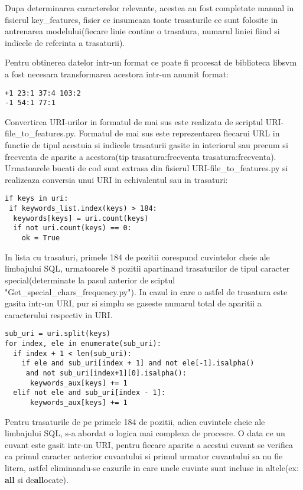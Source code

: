 Dupa determinarea caracterelor relevante, acestea au fost completate manual in fisierul key\_features, fisier ce insumeaza toate trasaturile ce sunt folosite in antrenarea modelului(fiecare linie contine o trasatura, numarul liniei fiind si indicele de referinta a trasaturii).

Pentru obtinerea datelor intr-un format ce poate fi procesat de biblioteca libsvm \cite{libsvm} a fost necesara transformarea acestora intr-un anumit format:

\begin{lstlisting}
+1 23:1 37:4 103:2
-1 54:1 77:1
\end{lstlisting}

Convertirea URI-urilor in formatul de mai sus este realizata de scriptul URI-file\_to\_features.py. Formatul de mai sus este reprezentarea fiecarui URL in functie de tipul acestuia si indicele trasaturii gasite in interiorul sau precum si frecventa de aparite a acestora(tip trasatura:frecventa trasatura:frecventa). Urmatoarele bucati de cod sunt extrasa din fisierul URI-file\_to\_features.py si realizeaza conversia unui URI in echivalentul sau in trasaturi:

\begin{lstlisting}
if keys in uri:
 if keywords_list.index(keys) > 184:
  keywords[keys] = uri.count(keys)
  if not uri.count(keys) == 0:
    ok = True
\end{lstlisting}

In lista cu trasaturi, primele 184 de pozitii corespund cuvintelor cheie ale limbajului SQL, urmatoarele 8 pozitii apartinand trasaturilor de tipul caracter special(determinate la pasul anterior de sciptul "Get\_special\_chars\_frequency.py"). In cazul in care o astfel de trasatura este gasita intr-un URI, pur si simplu se gaseste numarul total de aparitii a caracterului respectiv in URI.


\begin{lstlisting}
sub_uri = uri.split(keys)
for index, ele in enumerate(sub_uri):
  if index + 1 < len(sub_uri):
    if ele and sub_uri[index + 1] and not ele[-1].isalpha()
     and not sub_uri[index+1][0].isalpha():
      keywords_aux[keys] += 1
  elif not ele and sub_uri[index - 1]:
      keywords_aux[keys] += 1
\end{lstlisting}

Pentru trasaturile de pe primele 184 de pozitii, adica cuvintele cheie ale limbajului SQL, s-a abordat o logica mai complexa de procesre. O data ce un cuvant este gasit intr-un URI, pentru fiecare aparite a acestui cuvant se verifica ca primul caracter anterior cuvantului si primul urmator cuvantului sa nu fie litera, astfel eliminandu-se cazurile in care unele cuvinte sunt incluse in altele(ex: \textbf{all} si de\textbf{all}ocate).

